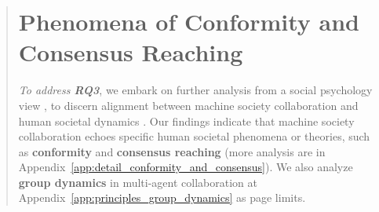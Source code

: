\documentclass[11pt]{article}
\newcommand{\customcomment}[3]{\textcolor{#1}{[#2:#3]}}
\newcommand{\bh}[1]{\customcomment{blue}{BH}{#1}}
\begin{document}
\begin{abstract}
\section{Phenomena of Conformity and Consensus Reaching}
\label{sec:conformity_consistency}


\emph{To address \textbf{RQ3}}, 
we embark on further analysis from a social psychology view \citep{1982_SocialPsychology,2004_SocialPsychology,J2009_SocialPsychology}, to discern alignment between machine society collaboration and human societal dynamics \citep{Science2010_HumanDynamics}. %
Our findings indicate that machine society collaboration echoes specific human societal phenomena or theories, such as \textbf{conformity} \citep{J2004_Conformity,J1969_Conformity,J2015_Conformity} and \textbf{consensus reaching} \citep{J1967_Consensus-Sociological,J1974_ConsensusReaching,J2018_Emergence-Consensus} (more analysis are in Appendix~\ref{app:detail_conformity_and_consensus}).
We also analyze \textbf{group dynamics} \citep{1968_GroupDynamics,J1987_GroupDynamics,Book2014_GroupDynamics,J2018_GroupDynamics,Book2018_GroupDynamics} in multi-agent collaboration at Appendix~\ref{app:principles_group_dynamics} as page limits. 





\end{abstract}
\end{document}
